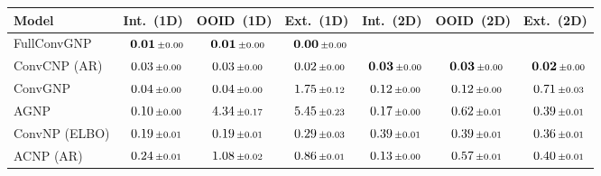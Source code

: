 \begin{tabular}[t]{lcccccc} 
\toprule 
Model & Int.\ (1D) & OOID\ (1D) & Ext.\ (1D) & Int.\ (2D) & OOID\ (2D) & Ext.\ (2D) \\ \midrule 
FullConvGNP & $\hphantom{\scalebox{0.7}[1]{$-$}}\mathbf{0.01}\,{ \scriptstyle \pm  0.00 }$ & $\hphantom{\scalebox{0.7}[1]{$-$}}\mathbf{0.01}\,{ \scriptstyle \pm  0.00 }$ & $\hphantom{\scalebox{0.7}[1]{$-$}}\mathbf{0.00}\,{ \scriptstyle \pm  0.00 }$ &  &  &  \\ 
ConvCNP (AR) & $\hphantom{\scalebox{0.7}[1]{$-$}}0.03\,{ \scriptstyle \pm  0.00 }$ & $\hphantom{\scalebox{0.7}[1]{$-$}}0.03\,{ \scriptstyle \pm  0.00 }$ & $\hphantom{\scalebox{0.7}[1]{$-$}}0.02\,{ \scriptstyle \pm  0.00 }$ & $\hphantom{\scalebox{0.7}[1]{$-$}}\mathbf{0.03}\,{ \scriptstyle \pm  0.00 }$ & $\hphantom{\scalebox{0.7}[1]{$-$}}\mathbf{0.03}\,{ \scriptstyle \pm  0.00 }$ & $\hphantom{\scalebox{0.7}[1]{$-$}}\mathbf{0.02}\,{ \scriptstyle \pm  0.00 }$ \\ 
ConvGNP & $\hphantom{\scalebox{0.7}[1]{$-$}}0.04\,{ \scriptstyle \pm  0.00 }$ & $\hphantom{\scalebox{0.7}[1]{$-$}}0.04\,{ \scriptstyle \pm  0.00 }$ & $\hphantom{\scalebox{0.7}[1]{$-$}}1.75\,{ \scriptstyle \pm  0.12 }$ & $\hphantom{\scalebox{0.7}[1]{$-$}}0.12\,{ \scriptstyle \pm  0.00 }$ & $\hphantom{\scalebox{0.7}[1]{$-$}}0.12\,{ \scriptstyle \pm  0.00 }$ & $\hphantom{\scalebox{0.7}[1]{$-$}}0.71\,{ \scriptstyle \pm  0.03 }$ \\ 
AGNP & $\hphantom{\scalebox{0.7}[1]{$-$}}0.10\,{ \scriptstyle \pm  0.00 }$ & $\hphantom{\scalebox{0.7}[1]{$-$}}4.34\,{ \scriptstyle \pm  0.17 }$ & $\hphantom{\scalebox{0.7}[1]{$-$}}5.45\,{ \scriptstyle \pm  0.23 }$ & $\hphantom{\scalebox{0.7}[1]{$-$}}0.17\,{ \scriptstyle \pm  0.00 }$ & $\hphantom{\scalebox{0.7}[1]{$-$}}0.62\,{ \scriptstyle \pm  0.01 }$ & $\hphantom{\scalebox{0.7}[1]{$-$}}0.39\,{ \scriptstyle \pm  0.01 }$ \\ 
ConvNP (ELBO) & $\hphantom{\scalebox{0.7}[1]{$-$}}0.19\,{ \scriptstyle \pm  0.01 }$ & $\hphantom{\scalebox{0.7}[1]{$-$}}0.19\,{ \scriptstyle \pm  0.01 }$ & $\hphantom{\scalebox{0.7}[1]{$-$}}0.29\,{ \scriptstyle \pm  0.03 }$ & $\hphantom{\scalebox{0.7}[1]{$-$}}0.39\,{ \scriptstyle \pm  0.01 }$ & $\hphantom{\scalebox{0.7}[1]{$-$}}0.39\,{ \scriptstyle \pm  0.01 }$ & $\hphantom{\scalebox{0.7}[1]{$-$}}0.36\,{ \scriptstyle \pm  0.01 }$ \\ 
ACNP (AR) & $\hphantom{\scalebox{0.7}[1]{$-$}}0.24\,{ \scriptstyle \pm  0.01 }$ & $\hphantom{\scalebox{0.7}[1]{$-$}}1.08\,{ \scriptstyle \pm  0.02 }$ & $\hphantom{\scalebox{0.7}[1]{$-$}}0.86\,{ \scriptstyle \pm  0.01 }$ & $\hphantom{\scalebox{0.7}[1]{$-$}}0.13\,{ \scriptstyle \pm  0.00 }$ & $\hphantom{\scalebox{0.7}[1]{$-$}}0.57\,{ \scriptstyle \pm  0.01 }$ & $\hphantom{\scalebox{0.7}[1]{$-$}}0.40\,{ \scriptstyle \pm  0.01 }$ \\ 

\end{tabular}
